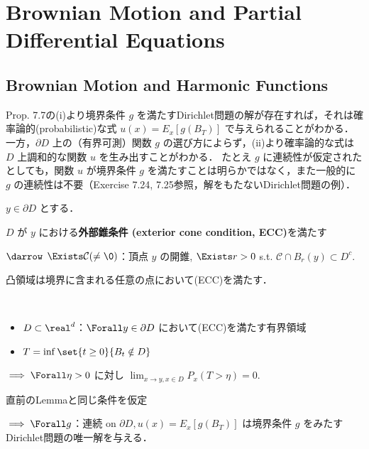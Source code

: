 \documentclass{jsarticle}
\title{}
\author{}
\date{
}
\begin{document}
\setcounter{section}{6}
\section{Brownian Motion and Partial Differential Equations}
\setcounter{subsection}{1}
\subsection{Brownian Motion and Harmonic Functions}

Prop. 7.7の(i)より境界条件 $g$ を満たすDirichlet問題の解が存在すれば，それは確率論的(probabilistic)な式 $u(x)=E_x[g(B_T)]$ で与えられることがわかる．
一方，$\partial D$ 上の（有界可測）関数 $g$ の選び方によらず，(ii)より確率論的な式は $D$ 上調和的な関数 $u$ を生み出すことがわかる．
たとえ $g$ に連続性が仮定されたとしても，関数 $u$ が境界条件 $g$ を満たすことは明らかではなく，また一般的に $g$ の連続性は不要（Exercise 7.24, 7.25参照，解をもたないDirichlet問題の例）．

\begin{df*}
    $y\in\partial D$ とする．
    
    $D$ が $y$ における\textbf{外部錐条件 (exterior cone condition, ECC)}を満たす
    
    $\darrow$
    $\Exists \mathcal{C}(\neq\0)$：頂点 $y$ の開錐, $\Exists r>0$ s.t. $\mathcal{C}\cap B_r(y)\subset D^c.$
\end{df*}

\begin{ex*}
    凸領域は境界に含まれる任意の点において(ECC)を満たす．
\end{ex*}

\setcounter{thm}{8}
\begin{lem}~
    \begin{itemize}
        \item $D\subset \real^d$：$\Forall y\in\partial D$ において(ECC)を満たす有界領域
        \item $T=\inf\set{t\ge0}{B_t\notin D}$
    \end{itemize}

    $\implies \Forall \eta>0$ に対し $\lim_{x\to y, x\in D}P_x(T>\eta) = 0.$
\end{lem}

\setcounter{thm}{7}
\begin{thm}[Dirichlet問題の解]
    直前のLemmaと同じ条件を仮定
    
    $\implies \Forall g$：連続 on $\partial D, u(x) = E_x[g(B_T)]$ は境界条件 $g$ をみたすDirichlet問題の唯一解を与える．
\end{thm}
\end{document}
